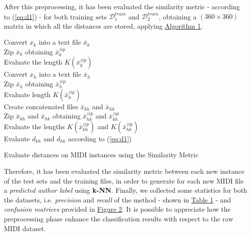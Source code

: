 \documentclass[a4paper]{article}
\begin{document}
	After this preprocessing, it has been evaluated the similarity metric - according to (\ref{eq:d1}) - for both training sets $\mathcal{D}_1^{train}$ and $\mathcal{D}_2^{train}$, obtaining a $(360 \times 360)$ matrix in which all the distances are stored, applying \hyperref[alg_1]{Algorithm 1}.
	
	\begin{algorithm}[!h]
		{
			Convert $x_k$ into a text file $\bar{x}_k$\\
			Zip $\bar{x}_k$ obtaining $\bar{x}_k^{zip}$\\
			Evaluate the length $K\left(\bar{x}_k^{zip}\right)$\\
			{
				Convert $x_h$ into a text file $\bar{x}_h$\\
				Zip $\bar{x}_h$ obtaining $\bar{x}_h^{zip}$\\
				Evaluate length $K\left(\bar{x}_h^{zip}\right)$\\
				
				\vspace{5px}
				Create concatenated files $\bar{x}_{kh}$ and $\bar{x}_{hk}$\\
				Zip $\bar{x}_{kh}$ and $\bar{x}_{hk}$ obtaining $\bar{x}_{hk}^{zip}$ and $\bar{x}_{kh}^{zip}$\\
				Evaluate the lengths $K\left(\bar{x}_{kh}^{zip}\right)$ and $K\left(\bar{x}_{hk}^{zip}\right)$\\
				\vspace{5px}
				Evalaute $d_{kh}$ and $d_{hk}$ according to (\ref{eq:d1})}}

		\vspace{10px}
		\label{alg_1}
		\caption{Evaluate distances on MIDI instances using the Similarity Metric}
	\end{algorithm}
	
	Therefore, it has been evaluated the similarity metric between each new instance of the test sets and the training files, in order to generate for each new MIDI file a \textit{predicted author label} using \textbf{k-NN}. Finally, we collected some statistics for both the datasets, i.e. \textit{precision} and \textit{recall} of the method - shown in \hyperref[tab:stats]{Table 1} - and \textit{confusion matrices} provided in \hyperref[fig:cm]{Figure 2}. It is possible to appreciate how the preprocessing phase enhance the classification results with respect to the raw MIDI dataset. 
	
\end{document}
